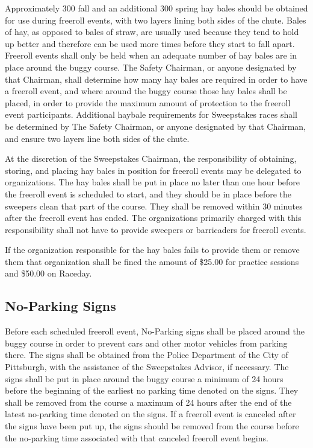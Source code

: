 	Approximately 300 fall and an additional 300 spring hay bales should be
	obtained for use during freeroll events, with two layers lining both sides
	of the chute. Bales of hay, as opposed to bales of straw, are usually used
	because they tend to hold up better and therefore can be used more times before
	they start to fall apart. Freeroll events shall only be held when an adequate
	number of hay bales are in place around the buggy course. The Safety Chairman,
	or anyone designated by that Chairman, shall determine how many hay bales are
	required in order to have a freeroll event, and where around the buggy course
	those hay bales shall be placed, in order to provide the maximum amount of
	protection to the freeroll event participants. Additional haybale requirements
	for Sweepstakes races shall be determined by The Safety Chairman, or anyone
	designated by that Chairman, and ensure two layers line both sides of the chute.

	At the discretion of the Sweepstakes Chairman, the responsibility of obtaining,
	storing, and placing hay bales in position for freeroll events may be
	delegated to organizations. The hay bales shall be put in place no later
	than one hour before the freeroll event is scheduled to start, and they
	should be in place before the sweepers clean that part of the course. They
	shall be removed within 30 minutes after the freeroll event has ended. The
	organizations primarily charged with this responsibility shall not have to
	provide sweepers or barricaders for freeroll events.

	If the organization responsible for the hay bales fails to provide them or
	remove them that organization shall be fined the amount of \$25.00 for
	practice sessions and \$50.00 on Raceday.


\subsection{No-Parking Signs}
\label{subsec:NoParking}

	Before each scheduled freeroll event, No-Parking signs shall be placed
	around the buggy course in order to prevent cars and other motor vehicles from
	parking there. The signs shall be obtained from the Police Department of the
	City of Pittsburgh, with the assistance of the Sweepstakes Advisor, if
	necessary. The signs shall be put in place around the buggy course a
    minimum of 24 hours before the beginning of the earliest no parking time
    denoted on the signs. They shall be removed from the course a maximum
    of 24 hours after the end of the latest no-parking time denoted on the signs.
    If a freeroll event is canceled after the signs have been put up, the signs
    should be removed from the course before the no-parking time associated
    with that canceled freeroll event begins.

